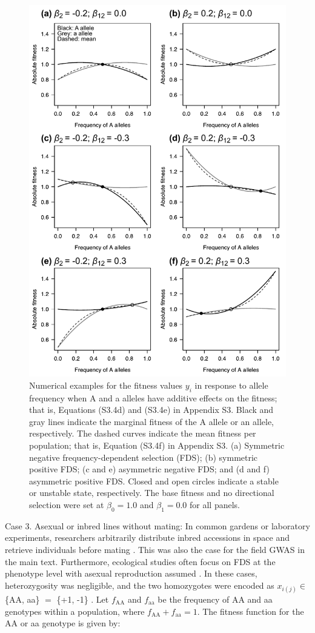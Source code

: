 \documentclass[12pt,]{article}
\begin{document}
\begin{figure}[]
  \includegraphics[width=0.75\linewidth]{AsymFDSadd.pdf}
  \caption{Numerical examples for the fitness values $y_i$ in response to allele frequency when A and a alleles have additive effects on the fitness; that is, Equations (S3.4d) and (S3.4e) in Appendix S3. Black and gray lines indicate the marginal fitness of the A allele or an allele, respectively. The dashed curves indicate the mean fitness per population; that is, Equation (S3.4f) in Appendix S3. (a) Symmetric negative frequency-dependent selection (FDS); (b) symmetric positive FDS; (c and e) asymmetric negative FDS; and (d and f) asymmetric positive FDS. Closed and open circles indicate a stable or unstable state, respectively. The base fitness and no directional selection were set at $\beta_0=1.0$ and $\beta_1=0.0$ for all panels.}
  \label{figS2:FDSadd}
\end{figure}

Case 3. Asexual or inbred lines without mating: In common gardens or laboratory experiments, researchers arbitrarily distribute inbred accessions in space and retrieve individuals before mating \citep[for example,][]{schutz1969inter, sato2019neighbor}. This was also the case for the field GWAS in the main text. Furthermore, ecological studies often focus on FDS at the phenotype level with asexual reproduction assumed \citep[for example,][]{takahashi2018balanced}. In these cases, heterozygosity was negligible, and the two homozygotes were encoded as $x_{i(j)} \in $ \{AA, aa\} $=$ \{+1, -1\} \citep{sato2019neighbor}. Let $f_\mathrm{AA}$ and $f_\mathrm{aa}$ be the frequency of AA and aa genotypes within a population, where $f_\mathrm{AA} + f_\mathrm{aa} = 1$. The fitness function for the AA or aa genotype is given by:
\end{document}
